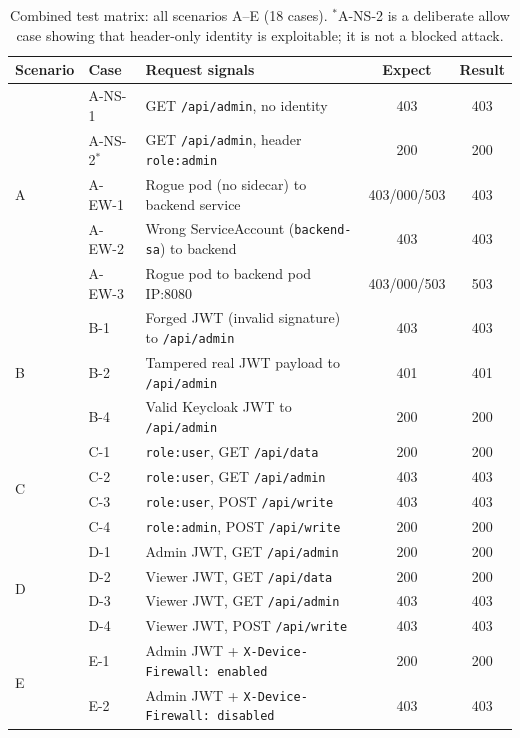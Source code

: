 \documentclass[conference]{IEEEtran}
\begin{document}
\begin{table}[!t]
\caption{Combined test matrix: all scenarios A--E (18 cases). $^{*}$A-NS-2 is a deliberate allow case showing that header-only identity is exploitable; it is not a blocked attack.}
\label{tab:allcases}
\centering
\scriptsize
\begin{tabularx}{\columnwidth}{l l >{\raggedright\arraybackslash}X c c}
\toprule
Scenario & Case & Request signals & Expect & Result \\
\midrule
\multirow{5}{*}{A}
  & A-NS-1 & GET \texttt{/api/admin}, no identity & 403 & 403 \\
  & A-NS-2$^{*}$ & GET \texttt{/api/admin}, header \texttt{role:admin} & 200 & 200 \\
  & A-EW-1 & Rogue pod (no sidecar) to backend service & 403/000/503 & 403 \\
  & A-EW-2 & Wrong ServiceAccount (\texttt{backend-sa}) to backend & 403 & 403 \\
  & A-EW-3 & Rogue pod to backend pod IP:8080 & 403/000/503 & 503 \\
\midrule
\multirow{3}{*}{B}
  & B-1 & Forged JWT (invalid signature) to \texttt{/api/admin} & 403 & 403 \\
  & B-2 & Tampered real JWT payload to \texttt{/api/admin} & 401 & 401 \\
  & B-4 & Valid Keycloak JWT to \texttt{/api/admin} & 200 & 200 \\
\midrule
\multirow{4}{*}{C}
  & C-1 & \texttt{role:user}, GET \texttt{/api/data} & 200 & 200 \\
  & C-2 & \texttt{role:user}, GET \texttt{/api/admin} & 403 & 403 \\
  & C-3 & \texttt{role:user}, POST \texttt{/api/write} & 403 & 403 \\
  & C-4 & \texttt{role:admin}, POST \texttt{/api/write} & 200 & 200 \\
\midrule
\multirow{4}{*}{D}
  & D-1 & Admin JWT, GET \texttt{/api/admin} & 200 & 200 \\
  & D-2 & Viewer JWT, GET \texttt{/api/data} & 200 & 200 \\
  & D-3 & Viewer JWT, GET \texttt{/api/admin} & 403 & 403 \\
  & D-4 & Viewer JWT, POST \texttt{/api/write} & 403 & 403 \\
\midrule
\multirow{2}{*}{E}
  & E-1 & Admin JWT + \texttt{X-Device-Firewall: enabled} & 200 & 200 \\
  & E-2 & Admin JWT + \texttt{X-Device-Firewall: disabled} & 403 & 403 \\
\bottomrule
\end{tabularx}
\end{table}
\end{document}
